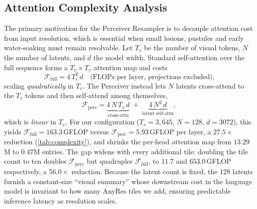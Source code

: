 \documentclass[runningheads]{llncs}
\begin{document}
\subsection{Attention Complexity Analysis}
\label{sec:complexity}

The primary motivation for the Perceiver Resampler is to decouple attention cost from input resolution, which is essential when small lesions, pustules and early water-soaking must remain resolvable. Let $T_v$ be the number of visual tokens, $N$ the number of latents, and $d$ the model width. Standard self-attention over the full sequence forms a $T_v \times T_v$ attention map and costs
\begin{equation}
  \mathcal{F}_{\text{full}} = 4\,T_v^2\,d
  \quad\text{(FLOPs per layer, projections excluded),}
  \label{eq:full}
\end{equation}
scaling \emph{quadratically} in $T_v$. The Perceiver instead lets $N$ latents cross-attend to the $T_v$ tokens and then self-attend among themselves,
\begin{equation}
  \mathcal{F}_{\text{perc}} = \underbrace{4\,N\,T_v\,d}_{\text{cross-attn}}
  \; + \; \underbrace{4\,N^2\,d}_{\text{latent self-attn}},
  \label{eq:perc}
\end{equation}
which is \emph{linear} in $T_v$. For our configuration ($T_v{=}3{,}645$, $N{=}128$, $d{=}3072$), this yields $\mathcal{F}_{\text{full}}{=}163.3$\,GFLOP versus $\mathcal{F}_{\text{perc}}{=}5.93$\,GFLOP per layer, a $27.5\times$ reduction (\cref{tab:complexity}), and shrinks the per-head attention map from $13.29$M to $0.47$M entries. The gap widens with every additional tile: doubling the tile count to ten doubles $\mathcal{F}_{\text{perc}}$ but quadruples $\mathcal{F}_{\text{full}}$, to $11.7$ and $653.0$\,GFLOP respectively, a $56.0\times$ reduction. Because the latent count is fixed, the 128 latents furnish a constant-size ``visual summary'' whose downstream cost in the language model is invariant to how many AnyRes tiles we add, ensuring predictable inference latency as resolution scales.
\end{document}
